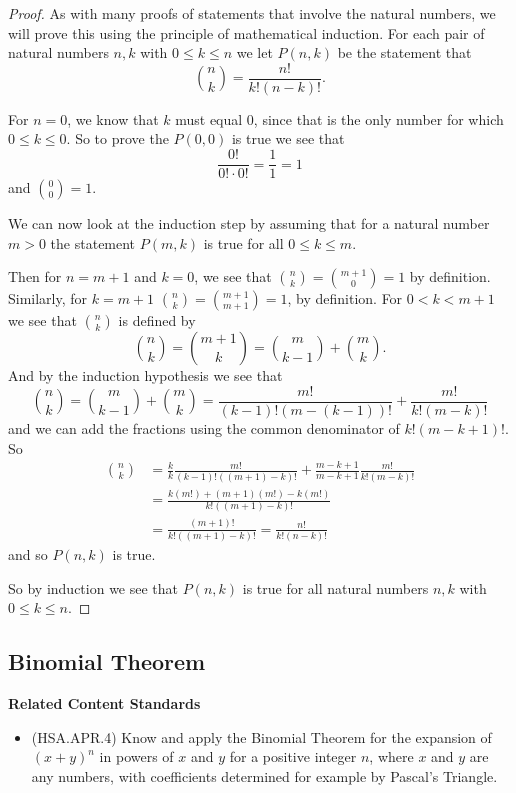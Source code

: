 \documentclass[
]{book}
\providecommand{\tightlist}{%
  \setlength{\itemsep}{0pt}\setlength{\parskip}{0pt}}
\newenvironment{standards}{}{}
\theoremstyle{definition}
\theoremstyle{definition}
\theoremstyle{definition}
\theoremstyle{definition}
\theoremstyle{remark}
\begin{document}
\begin{proof}
As with many proofs of statements that involve the natural numbers, we will prove this using the principle of mathematical induction. For each pair of natural numbers \(n,k\) with \(0\leq k \leq n\) we let \(P(n,k)\) be the statement that \[\binom{n}{k} = \frac{n!}{k!(n-k)!}.\]

For \(n=0\), we know that \(k\) must equal \(0\), since that is the only number for which \(0\leq k \leq 0\). So to prove the \(P(0,0)\) is true we see that \[\frac{0!}{0!\cdot 0!} = \frac{1}{1} = 1\] and \(\binom{0}{0}=1\).

We can now look at the induction step by assuming that for a natural number \(m>0\) the statement \(P(m,k)\) is true for all \(0\leq k \leq m\).

Then for \(n=m+1\) and \(k=0\), we see that \(\binom{n}{k} = \binom{m+1}{0} =1\) by definition. Similarly, for \(k=m+1\) \(\binom{n}{k}=\binom{m+1}{m+1}=1\), by definition. For \(0<k<m+1\) we see that \(\binom{n}{k}\) is defined by
\[\binom{n}{k} = \binom{m+1}{k} = \binom{m}{k-1} + \binom{m}{k}.\] And by the induction hypothesis we see that
\[\binom{n}{k} = \binom{m}{k-1} + \binom{m}{k} = \frac{m!}{(k-1)!(m-(k-1))!} +\frac{m!}{k!(m-k)!}\] and we can add the fractions using the common denominator of \(k!(m-k+1)!\). So
\begin{align*}
\binom{n}{k} &= \frac{k}{k}\frac{m!}{(k-1)!((m+1)-k)!} + \frac{m-k+1}{m-k+1} \frac{m!}{k!(m-k)!}\\
&= \frac{k(m!) + (m+1)(m!) -k (m!)}{k!((m+1)-k)!} \\
&= \frac{(m+1)!}{k!((m+1)-k)!} = \frac{n!}{k!(n-k)!}
\end{align*}
and so \(P(n,k)\) is true.

So by induction we see that \(P(n,k)\) is true for all natural numbers \(n,k\) with \(0\leq k \leq n\).
\end{proof}

\hypertarget{binomial-theorem}{%
\subsection{Binomial Theorem}\label{binomial-theorem}}

\begin{standards}

\begin{center}
\textbf{Related Content Standards}

\end{center}

\begin{itemize}
\tightlist
\item
  (HSA.APR.4) Know and apply the Binomial Theorem for the expansion of \((x+y)^n\) in powers of \(x\) and \(y\) for a positive integer \(n\), where \(x\) and \(y\) are any numbers, with coefficients determined for example by Pascal's Triangle.
\end{itemize}

\end{standards}
\end{document}
